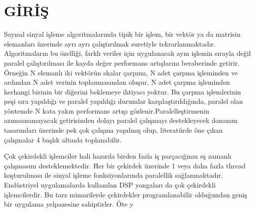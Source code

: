 \chapter{G\.{I}R\.{I}\c{S}}
Sayısal sinyal işleme algoritmalarında tipik bir işlem, bir vektör ya da matrisin elemanları üzerinde ayrı ayrı çalıştırılmak suretiyle tekrarlanmaktadır. Algoritmaların bu özelliği, farklı veriler için uygulanacak aynı işlemin sırayla değil paralel çalıştırılması ile kayda değer performans artışlarını beraberinde getirir. Örneğin N elemanlı iki vektörün skalar çarpımı, N adet çarpma işleminden ve ardından N adet verinin toplanmasından oluşur. N adet çarpma işleminden herhangi birinin bir diğerini beklemeye ihtiyacı yoktur. Bu çarpma işlemlerinin peşi sıra yapıldığı ve paralel yapıldığı durumlar karşılaştırıldığında, paralel olan yöntemde N kata yakın performans artışı gözlenir.Paralelleştirmenin azımsanamayacak getirisinden dolayı paralel çalışmayı destekleyecek donanım tasarımları üzerinde pek çok çalışma yapılmış olup, literatürde öne çıkan çalışmalar 4 başlık altında toplanabilir.  \par

Çok çekirdekli işlemciler hali hazırda birden fazla iş parçacığının eş zamanlı çalışmasını desteklemektedir. Her bir çekirdek üzerinde 1 veya daha fazla thread koşturulması ile sinyal işleme fonksiyonlarında paralellik sağlanmaktadır. Endüstriyel uygulamalarda kullanılan DSP yongaları da çok çekirdekli işlemcilerdir. Bu tarz mimarilerde çekirdekler programlanabilir olduğundan geniş bir uygulama yelpazesine sahiptirler. Öte y

